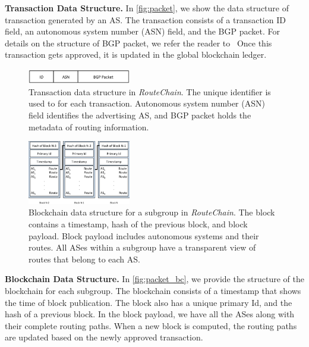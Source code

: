 \documentclass[5p]{elsarticle}
\newcommand{\BfPara}[1]{{\noindent\bf#1.}\xspace}
\newcommand{\rc}{{{\em RouteChain}}\xspace}
\begin{document}
\BfPara{Transaction Data Structure}\label{secc:tds}
In \autoref{fig:packet}, we show the data structure of transaction generated by an AS. The transaction consists of a transaction ID field, an autonomous system number (ASN) field, and the BGP packet. For details on the structure of BGP packet, we refer the reader to~\cite{rfc4271} Once this transaction gets approved, it is updated in the global blockchain ledger. 


\begin{figure}[t]
\begin{center}
\includegraphics[width=0.40\textwidth]{fig/packet.pdf}
\caption{Transaction data structure in \rc. The unique identifier is used to for each transaction. Autonomous system number (ASN) field identifies the advertising AS, and BGP packet holds the metadata of routing information. } 
\label{fig:packet}
\end{center}
\end{figure}

\begin{figure}[t]
\begin{center}
\includegraphics[width=0.40\textwidth]{fig/blockchain.pdf}
\caption{Blockchain data structure for a subgroup in \rc. The block contains a timestamp, hash of the previous block, and block payload. Block payload includes autonomous systems and their routes. All ASes within a subgroup have a transparent view of routes that belong to each AS. } 
\label{fig:packet_bc}
\end{center}
\end{figure}




\BfPara{Blockchain Data Structure}
In \autoref{fig:packet_bc}, we provide the structure of the blockchain for each subgroup. The blockchain consists of a timestamp that shows the time of block publication. The block also has a unique primary Id, and the hash of a previous block. In the block payload, we have all the ASes along with their complete routing paths. When a new block is computed, the routing paths are updated based on the newly approved transaction.
\end{document}
